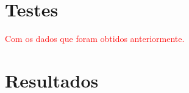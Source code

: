 \label{chapter:Avaliacao}


\section{Testes}

\par
\textcolor{red}{Com os dados que foram obtidos anteriormente.}

\section{Resultados}
